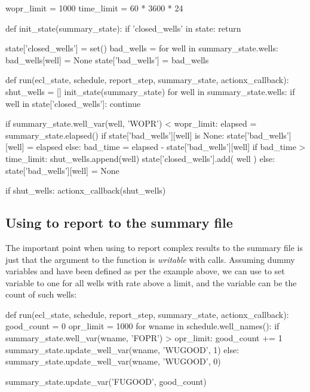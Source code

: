 \begin{code}
wopr_limit = 1000
time_limit = 60 * 3600 * 24

def init_state(summary_state):
    if 'closed_wells' in state:
        return

    state['closed_wells'] = set()
    bad_wells = {}
    for well in summary_state.wells:
        bad_wells[well] = None
    state['bad_wells'] = bad_wells


def run(ecl_state, schedule, report_step, summary_state, actionx_callback):
    shut_wells = []
    init_state(summary_state)
    for well in summary_state.wells:
        if well in state['closed_wells']:
           continue

        if summary_state.well_var(well, 'WOPR') < wopr_limit:
            elapsed = summary_state.elapsed()
            if state['bad_wells'][well] is None:
                state['bad_wells'][well] = elapsed
            else:
                bad_time = elapsed - state['bad_wells'][well]
                if bad_time > time_limit:
                    shut_wells.append(well)
                    state['closed_wells'].add( well )         
        else:
            state['bad_wells'][well] = None

    if shut_wells:
       actionx_callback(shut_wells)

\end{code}

\subsection{Using \pyaction{} to report to the summary file}
The important point when using \pyaction{} to report complex results to the
summary file is just that the  argument to the
 function is \emph{writable} with 
calls. Assuming dummy \udq{} variables  and  have been
defined as per the example above, we can use \pyaction{} to set variable
 to one for all wells with rate above a limit, and the 
variable can be the count of such wells:
\begin{code}
def run(ecl_state, schedule, report_step, summary_state, actionx_callback):
    good_count = 0
    opr_limit = 1000
    for wname in schedule.well_names():
        if summary_state.well_var(wname, 'FOPR') > opr_limit:
            good_count += 1
            summary_state.update_well_var(wname, 'WUGOOD', 1)
        else:
            summary_state.update_well_var(wname, 'WUGOOD', 0)

    summary_state.update_var('FUGOOD', good_count)
\end{code}



